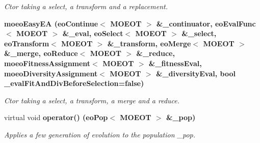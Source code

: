 \begin{CompactItemize}
\begin{CompactList}\small\item\em Ctor taking a select, a transform and a replacement. \item\end{CompactList}\item 
\bf{moeo\-Easy\-EA} (\bf{eo\-Continue}$<$ MOEOT $>$ \&\_\-continuator, \bf{eo\-Eval\-Func}$<$ MOEOT $>$ \&\_\-eval, \bf{eo\-Select}$<$ MOEOT $>$ \&\_\-select, \bf{eo\-Transform}$<$ MOEOT $>$ \&\_\-transform, \bf{eo\-Merge}$<$ MOEOT $>$ \&\_\-merge, \bf{eo\-Reduce}$<$ MOEOT $>$ \&\_\-reduce, \bf{moeo\-Fitness\-Assignment}$<$ MOEOT $>$ \&\_\-fitness\-Eval, \bf{moeo\-Diversity\-Assignment}$<$ MOEOT $>$ \&\_\-diversity\-Eval, bool \_\-eval\-Fit\-And\-Div\-Before\-Selection=false)
\begin{CompactList}\small\item\em Ctor taking a select, a transform, a merge and a reduce. \item\end{CompactList}\item 
virtual void \bf{operator()} (\bf{eo\-Pop}$<$ MOEOT $>$ \&\_\-pop)
\begin{CompactList}\small\item\em Applies a few generation of evolution to the population \_\-pop. \item\end{CompactList}\end{CompactItemize}
